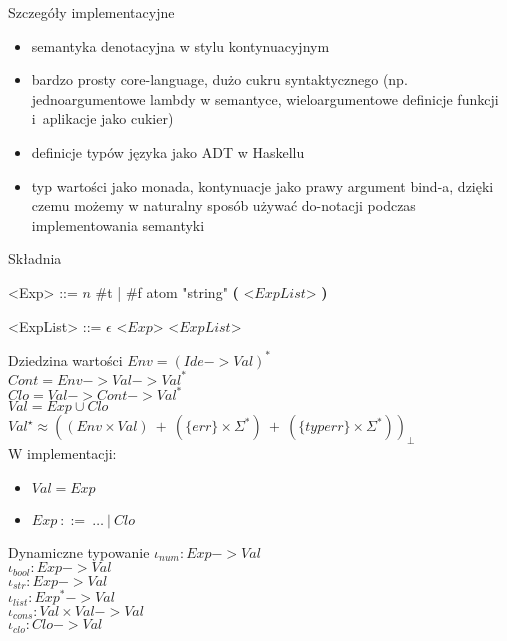 \documentclass[12pt,serif]{beamer}
\begin{document}
\begin{frame}{Szczegóły implementacyjne}
\begin{itemize}
  \item semantyka denotacyjna w stylu kontynuacyjnym
  \item bardzo prosty core-language, dużo cukru syntaktycznego
        (np. jednoargumentowe lambdy w semantyce,
        wieloargumentowe definicje funkcji i~aplikacje jako cukier)
  \item definicje typów języka jako ADT w Haskellu
  \item typ wartości jako monada, kontynuacje jako prawy argument bind-a,
        dzięki czemu możemy w naturalny sposób używać do-notacji podczas
        implementowania semantyki
\end{itemize}
\end{frame}

\begin{frame}{Składnia}
\setlength{\grammarindent}{8em}
\begin{grammar}
<Exp> ::= $n$
\alt \#t | \#f
\alt atom
\alt "string"
\alt \textbf{(} <$ExpList$> \textbf{)}

<ExpList> ::= $\epsilon$
\alt <$Exp$> <$ExpList$>
\end{grammar}
\end{frame}

\begin{frame}{Dziedzina wartości}
$Env = (Ide -> Val)^{*}$ \\
$Cont = Env -> Val -> Val^{*}$ \\
$Clo = Val -> Cont -> Val^{*}$ \\
$Val = Exp \cup Clo$ \\
$Val^{\star} \approx ((Env \times Val)~+~(\{err\} \times \Sigma^{*})~+~(\{typerr\} \times \Sigma^{*}))_{\bot}$\newline
\\
\pause
W implementacji:
\begin{itemize}
  \item $Val = Exp$
  \item $Exp~::=~\ldots~|~Clo$
\end{itemize}
\end{frame}


\begin{frame}{Dynamiczne typowanie}
$\iota_{num} : Exp -> Val$ \\
$\iota_{bool} : Exp -> Val$ \\
$\iota_{str} : Exp -> Val$ \\
$\iota_{list} : Exp^{*} -> Val$ \\
$\iota_{cons} : Val \times Val -> Val$ \\
$\iota_{clo} : Clo -> Val$ \\
\end{frame}
\end{document}
